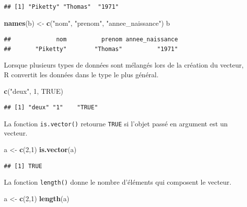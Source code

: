 \documentclass[
  11pt,
]{book}
\newenvironment{Shaded}{\begin{snugshade}}{\end{snugshade}}
\newcommand{\DecValTok}[1]{\textcolor[rgb]{0.00,0.00,0.81}{#1}}
\newcommand{\KeywordTok}[1]{\textcolor[rgb]{0.13,0.29,0.53}{\textbf{#1}}}
\newcommand{\NormalTok}[1]{#1}
\newcommand{\OtherTok}[1]{\textcolor[rgb]{0.56,0.35,0.01}{#1}}
\newcommand{\StringTok}[1]{\textcolor[rgb]{0.31,0.60,0.02}{#1}}
\numberwithin{equation}{section}
\numberwithin{countremarque}{section}
\begin{document}
\begin{lstlisting}
## [1] "Piketty" "Thomas"  "1971"
\end{lstlisting}

\begin{Shaded}
\begin{Highlighting}[]
\KeywordTok{names}\NormalTok{(b) \textless{}{-}}\StringTok{ }\KeywordTok{c}\NormalTok{(}\StringTok{"nom"}\NormalTok{, }\StringTok{"prenom"}\NormalTok{, }\StringTok{"annee\_naissance"}\NormalTok{)}
\NormalTok{b}
\end{Highlighting}
\end{Shaded}

\begin{lstlisting}
##             nom          prenom annee_naissance 
##       "Piketty"        "Thomas"          "1971"
\end{lstlisting}

Lorsque plusieurs types de données sont mélangés lors de la création du vecteur, R convertit les données dans le type le plus général.

\begin{Shaded}
\begin{Highlighting}[]
\KeywordTok{c}\NormalTok{(}\StringTok{"deux"}\NormalTok{, }\DecValTok{1}\NormalTok{, }\OtherTok{TRUE}\NormalTok{)}
\end{Highlighting}
\end{Shaded}

\begin{lstlisting}
## [1] "deux" "1"    "TRUE"
\end{lstlisting}

La fonction \texttt{is.vector()} retourne \texttt{TRUE} si l'objet passé en argument est un vecteur.

\begin{Shaded}
\begin{Highlighting}[]
\NormalTok{a \textless{}{-}}\StringTok{ }\KeywordTok{c}\NormalTok{(}\DecValTok{2}\NormalTok{,}\DecValTok{1}\NormalTok{)}
\KeywordTok{is.vector}\NormalTok{(a)}
\end{Highlighting}
\end{Shaded}

\begin{lstlisting}
## [1] TRUE
\end{lstlisting}

La fonction \texttt{length()} donne le nombre d'éléments qui composent le vecteur.

\begin{Shaded}
\begin{Highlighting}[]
\NormalTok{a \textless{}{-}}\StringTok{ }\KeywordTok{c}\NormalTok{(}\DecValTok{2}\NormalTok{,}\DecValTok{1}\NormalTok{)}
\KeywordTok{length}\NormalTok{(a)}
\end{Highlighting}
\end{Shaded}
\end{document}
